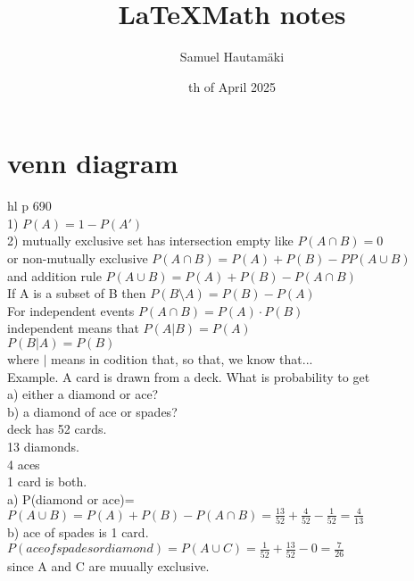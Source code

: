 \documentclass{article}
\title{\LaTeX Math notes}
\author{Samuel Hautamäki}
\date{th of April 2025}
\begin{document}
  \maketitle
   
  \section{venn diagram}
  hl p 690\\
  1) $P(A)=1-P(A')$\\
  2) mutually exclusive set has intersection empty like $P(A\cap B)=0$\\
  or non-mutually exclusive $P(A\cap B)=P(A)+P(B)-PP(A\cup B)$\\
  and addition rule $P(A\cup B)=P(A)+P(B)-P(A\cap B)$\\
  If A is a subset of B then $P(B\setminus A)=P(B)-P(A)$\\
  For independent events $P(A\cap B)=P(A)\cdot P(B)$\\
  independent means that $P(A|B)=P(A)$\\
  $P(B|A)=P(B)$\\
  where $|$ means in codition that, so that, we know that...\\
  Example. A card is drawn from a deck. What is probability to get\\
  a) either a diamond or ace?\\
  b) a diamond of ace or spades?\\
  deck has 52 cards.\\
  13 diamonds.\\
  4 aces\\
  1 card is both.\\
  a) P(diamond or ace)=$P(A\cup B)=P(A)+P(B)-P(A\cap B)=\frac{13}{52}+\frac{4}{52}-\frac{1}{52}=\frac{4}{13}$\\
  b) ace of spades is 1 card.\\
  $P(ace of spades or diamond)=P(A\cup C)=\frac{1}{52}+\frac{13}{52}-0=\frac{7}{26}$\\
  since A and C are muually exclusive.\\
\end{document}
